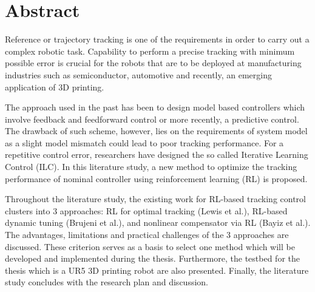 %
\chapter*{Abstract}%

Reference or trajectory tracking is one of the requirements in order to carry out a complex robotic task. Capability to perform a precise tracking with minimum possible error is crucial for the robots that are to be deployed at manufacturing industries such as semiconductor, automotive and recently, an emerging application of 3D printing.

The approach used in the past has been to design model based controllers which involve feedback and feedforward control or more recently, a predictive control. The drawback of such scheme, however, lies on the requirements of system model as a slight model mismatch could lead to poor tracking performance. For a repetitive control error, researchers have designed the so called Iterative Learning Control (ILC). In this literature study, a new method to optimize the tracking performance of nominal controller using reinforcement learning (RL) is proposed. 

Throughout the literature study, the existing work for RL-based tracking control clusters into 3 approaches: RL for optimal tracking (Lewis et al.), RL-based dynamic tuning (Brujeni et al.), and nonlinear compensator via RL (Bayiz et al.). The advantages, limitations and practical challenges of the 3 approaches are discussed. These criterion serves as a basis to select one method which will be developed and implemented during the thesis. Furthermore, the testbed for the thesis which is a UR5 3D printing robot are also presented. Finally, the literature study concludes with the research plan and discussion.